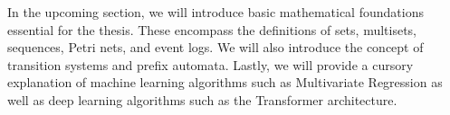 \begin{comment}
    In the preliminaries you present well-understood mathematical concepts that you need in your thesis.
For example, you can define the natural numbers as $\mathbb{N}{=}\{0,1,2,...\}$, and, correspondingly $\mathbb{N}^+{=}\mathbb{N}{\setminus}\{0\}$.
A preliminary notion is either a well-defined commonly understood mathematical notion, e.g., sets, multisets, graphs, sequences, Petri nets, \dots, or, it is a concept clearly defined in another paper, i.e., you just adopt the notation (or a slight variation thereof).
\emph{Any concept you use should be defined in your thesis}.
You should never write: \enquote{We use Workflow nets, a definition of these can be found here [X]}.
If you use it, explain it.

Concepts that are unique to your approach are not part of the preliminaries, i.e., they are described in the approach section itself.

Some useful tips:
\begin{itemize}
    \item When introducing a complex concept, use the following structure (always works):
    \begin{itemize}
        \item Explain the concept informally.
        \item Provide a formal definition of the concept.
        \item Provide an example, using the formal definition, of the concept.
    \end{itemize}
    In your examples, try to be \emph{as visual as you can}, often, an image says more than 5 pages of text.
    \item use commands, e.g., \texttt{$\backslash$newcommand\{$\backslash$naturals\}\{$\backslash$ensuremath\{$\backslash$mathbb\{N\}\}\}}
\end{itemize}
\end{comment}

In the upcoming section, we will introduce basic mathematical foundations essential for the thesis. These encompass the definitions of sets, multisets, sequences, Petri nets, and event logs. We will also introduce the concept of transition systems and prefix automata. Lastly, we will provide a cursory explanation of machine learning algorithms such as Multivariate Regression as well as deep learning algorithms such as the Transformer architecture.



